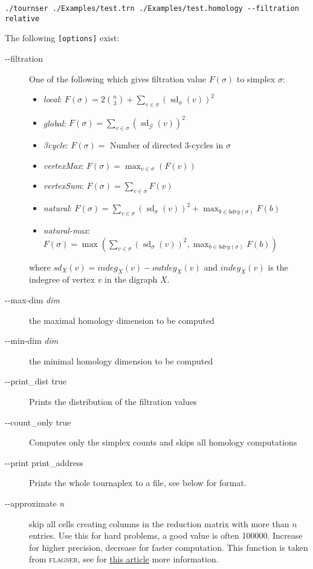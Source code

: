 \documentclass{amsart}
\theoremstyle{definition}
\newcommand{\sd}{\operatorname{\mathrm{sd}}}
\begin{document}
\begin{verbatim}./tournser ./Examples/test.trn ./Examples/test.homology --filtration relative\end{verbatim}

\vspace{1em}

\noindent
The following \texttt{[options]} exist:

\enlargethispage{\baselineskip}
\begin{description} 
  \item [-{}-filtration] One of the following which gives filtration value $F(\sigma)$ to simplex $\sigma$:
  \begin{itemize}
    \item \emph{local}: $F(\sigma)=2\binom{n}{3}+\sum_{v\in \sigma}(\sd_\sigma(v))^2$
    \item \emph{global}:  $F(\sigma)=\sum_{v\in \sigma}(\sd_\mathcal{G}(v))^2$
    \item \emph{3cycle}: $F(\sigma)=$ Number of directed 3-cycles in $\sigma$
    \item \emph{vertexMax}: $F(\sigma)=\max_{v\in\sigma}(F(v))$
    \item \emph{vertexSum}: $F(\sigma)=\sum_{v\in\sigma}F(v)$
    \item \emph{natural}: $F(\sigma)=\sum_{v\in \sigma}(\sd_\sigma(v))^2+\max_{b\in bdry(\sigma)}F(b)$
    \item \emph{natural-max}: $F(\sigma)=\max(\sum_{v\in \sigma}(\sd_\sigma(v))^2,\max_{b\in bdry(\sigma)}F(b))$
  \end{itemize} 
  where $sd_X(v)=indeg_X(v)-outdeg_X(v)$ and $indeg_X(v)$ is the indegree of vertex $v$ in the digraph $X$.
  \item [-{}-max-dim \textit{dim}] the maximal homology dimension to be computed
  \item [-{}-min-dim \textit{dim}] the minimal homology dimension to be computed
  \item [-{}-print\_dist true] Prints the distribution of the filtration values
  \item [-{}-count\_only true] Computes only the simplex counts and skips all homology computations
  \item [-{}-print print\_address] Prints the whole tournaplex to a file, see below for format.
  \item [-{}-approximate \textit{n}] skip all cells creating columns in the reduction matrix with
    more than $n$ entries. Use this for hard problems, a good value is often 100000. Increase for
    higher precision, decrease for faster computation. This function is taken from \textsc{flagser}, see for \href{https://www.mdpi.com/1999-4893/13/1/19}{this article} more information.
\end{description}
\end{document}
